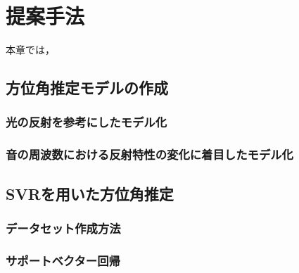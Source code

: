 \section{提案手法}
\label{chap:Consideration_pouring}
本章では，


\subsection{方位角推定モデルの作成}
\label{sec:deformalbe_items}

\subsubsection{光の反射を参考にしたモデル化}
\label{sec:problem_pouring_deformable_object}

\subsubsection{音の周波数における反射特性の変化に着目したモデル化}
\label{sec:pouring_by_human}

\subsection{SVRを用いた方位角推定}
\label{sec:pouring_by_human_system}

\subsubsection{データセット作成方法}
\label{sec:pouring_by_human_result}

\subsubsection{サポートベクター回帰}
\label{sec:pouring_by_human_discussion}

\newpage